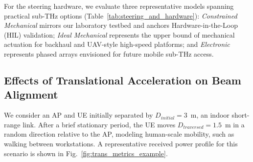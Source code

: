 \documentclass[fleqn,10pt]{wlscirep}
\begin{document}
For the steering hardware, we evaluate three representative models spanning practical sub-THz options (Table~\ref{tab:steering_and_hardware}): \textit{Constrained Mechanical} mirrors our laboratory testbed and anchors Hardware-in-the-Loop (HIL) validation; \textit{Ideal Mechanical} represents the upper bound of mechanical actuation for backhaul and UAV-style high-speed platforms; and \textit{Electronic} represents phased arrays envisioned for future mobile sub-THz access.



\subsection*{Effects of Translational Acceleration on Beam Alignment}

We consider an AP and UE initially separated by $D_{initial} = 3$~m, an indoor short-range link\cite{9013236}. After a brief stationary period, the UE moves $D_{traversed} = 1.5$~m in a random direction relative to the AP, modeling human-scale mobility, such as walking between workstations. A representative received power profile for this scenario is shown in Fig.~\ref{fig:trans_metrics_example}.
\end{document}
